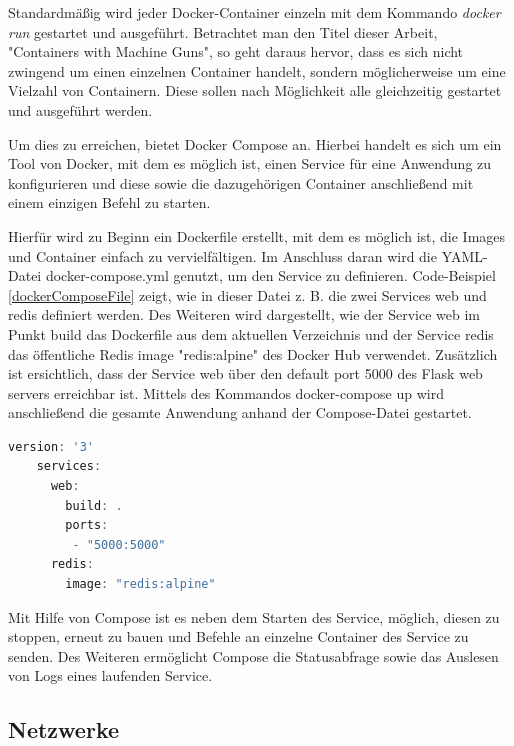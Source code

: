 Standardmäßig wird jeder Docker-Container einzeln mit dem Kommando \textit{docker run} gestartet und ausgeführt.
Betrachtet man den Titel dieser Arbeit, "Containers with Machine Guns", so geht daraus hervor, dass es sich nicht zwingend um einen einzelnen Container handelt, sondern möglicherweise um eine Vielzahl von Containern.
Diese sollen nach Möglichkeit alle gleichzeitig gestartet und ausgeführt werden.

Um dies zu erreichen, bietet Docker Compose an.
Hierbei handelt es sich um ein Tool von Docker, mit dem es möglich ist, einen Service für eine Anwendung zu konfigurieren und diese sowie die dazugehörigen Container anschließend mit einem einzigen Befehl zu starten.

Hierfür wird zu Beginn ein Dockerfile erstellt, mit dem es möglich ist, die Images und Container einfach zu vervielfältigen.
Im Anschluss daran wird die YAML-Datei docker-compose.yml genutzt, um den Service zu definieren.
Code-Beispiel \ref{dockerComposeFile} zeigt, wie in dieser Datei z. B. die zwei Services web und redis definiert werden.
Des Weiteren wird dargestellt, wie der Service web im Punkt build das Dockerfile aus dem aktuellen Verzeichnis und der Service redis das öffentliche Redis image "redis:alpine" des Docker Hub verwendet.
Zusätzlich ist ersichtlich, dass der Service web über den default port 5000 des Flask web servers erreichbar ist.
Mittels des Kommandos docker-compose up wird anschließend die gesamte Anwendung anhand der Compose-Datei gestartet.

\begin{minipage}{\linewidth}
	\begin{lstlisting}[frame=single,caption=Beispiel Docker Compose Datei \cite{Docker:online2}, label=dockerComposeFile, language=Scala]
	version: '3'
	services:
	  web:
	    build: .
	    ports:
	     - "5000:5000"
	  redis:
	    image: "redis:alpine"
	\end{lstlisting}
\end{minipage}

Mit Hilfe von Compose ist es neben dem Starten des Service, möglich, diesen zu stoppen, erneut zu bauen und Befehle an einzelne Container des Service zu senden.
Des Weiteren ermöglicht Compose die Statusabfrage sowie das Auslesen von Logs eines laufenden Service.

\subsection{Netzwerke}

